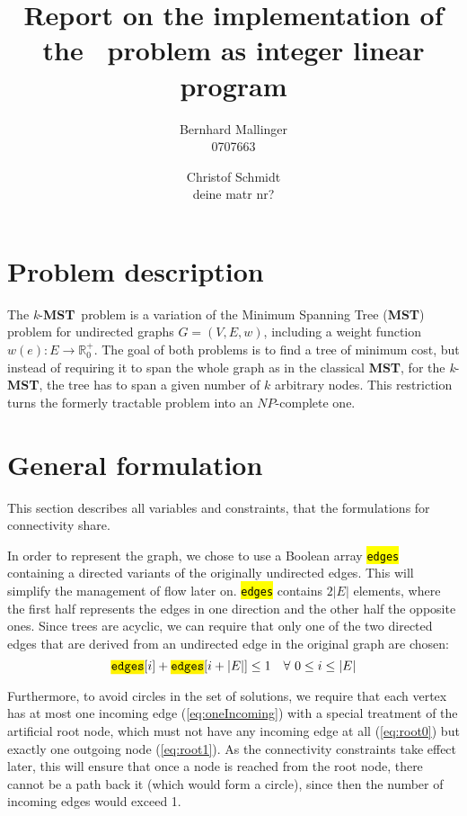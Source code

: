 \documentclass[,%
			paper=a4,%
			DIV12,
			liststotoc,
			bibtotoc,
			draft=false,%
			numbers=noendperiod
			]{scrartcl}
\title{Report on the implementation of the \kmst\ problem as integer linear program}
\author{Bernhard Mallinger \\ 0707663 \and Christof Schmidt \\ deine matr nr?}
\newcommand{\mst}{\textbf{MST}}
\newcommand{\kmst}{\textit{k}-\mst}
\newcommand{\ilc}[1]{\hl{\texttt{#1}}} %
\begin{document}
\maketitle

\section{Problem description}

The \kmst\ problem is a variation of the Minimum Spanning Tree (\mst) problem for undirected graphs $G = (V, E, w)$, including a weight function $w(e) : E \rightarrow \mathbb{R}^+_0$.
The goal of both problems is to find a tree of minimum cost, but instead of requiring it to span the whole graph as in the classical \mst, for the \kmst, the tree has to span a given number of $k$ arbitrary nodes.
This restriction turns the formerly tractable problem into an $NP$-complete one.

\section{General formulation}

This section describes all variables and constraints, that the formulations for connectivity share.

In order to represent the graph, we chose to use a Boolean array \ilc{edges} containing a directed variants of the originally undirected edges.
This will simplify the management of flow later on.
\ilc{edges} contains $2|E|$ elements, where the first half represents the edges in one direction and the other half the opposite ones.
Since trees are acyclic, we can require that only one of the two directed edges that are derived from an undirected edge in the original graph are chosen:
\begin{equation}
 \ilc{edges}[i] + \ilc{edges}[i + |E|] \leq 1\quad\forall~0\leq i \leq |E|
\end{equation}

Furthermore, to avoid circles in the set of solutions, we require that each vertex has at most one incoming edge (\eqref{eq:oneIncoming}) with a special treatment of the artificial root node, which must not have any incoming edge at all (\eqref{eq:root0}) but exactly one outgoing node (\eqref{eq:root1}). 
As the connectivity constraints take effect later, this will ensure that once a node is reached from the root node, there cannot be a path back it (which would form a circle), since then the number of incoming edges would exceed 1.
\end{document}
